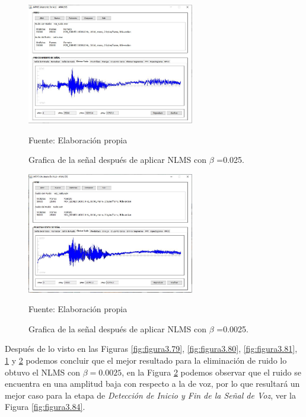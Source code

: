 \begin{figure}[H]
\begin{center}
\includegraphics[width=0.65\textwidth]{Imagenes/Cap3/image082}
\end{center}
\begin{center}
\vskip -0.5cm
\caption{\small{Grafica de la señal después de aplicar NLMS con $\beta$ =0.025.}}
\label{fig:figura3.82}
{\small{Fuente: Elaboración propia}}
\end{center}
\end{figure}

\begin{figure}[H]
\begin{center}
\includegraphics[width=0.65\textwidth]{Imagenes/Cap3/image083}
\end{center}
\begin{center}
\vskip -0.5cm
\caption{\small{Grafica de la señal después de aplicar NLMS con $\beta$ =0.0025.}}
\label{fig:figura3.83}
{\small{Fuente: Elaboración propia}}
\end{center}
\end{figure}

Después de lo visto en las Figuras \ref{fig:figura3.79}, \ref{fig:figura3.80}, \ref{fig:figura3.81}, \ref{fig:figura3.82} y \ref{fig:figura3.83} podemos concluir que el mejor resultado para la eliminación de ruido lo obtuvo el NLMS con $\beta = 0.0025$, en la Figura \ref{fig:figura3.83} podemos observar que el ruido se encuentra en una amplitud baja con respecto a la de voz, por lo que resultará un mejor caso para la etapa de \textit{Detección de Inicio y Fin de la Señal de Voz}, ver la Figura \ref{fig:figura3.84}.

